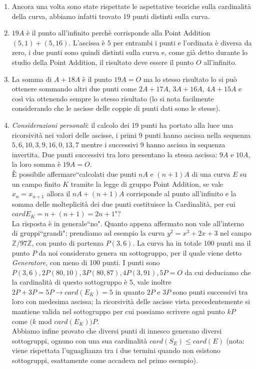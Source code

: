 \documentclass[a4paper,12pt]{tesiinfo}
\begin{document}
\begin{enumerate}
    
    \item Ancora una volta sono state rispettate le aspettative teoriche sulla cardinalit\`a della curva, abbiamo infatti trovato 19 punti distinti sulla curva.
    
    \item $19A$ \`e il punto all'infinito perch\`e corrisponde alla Point Addition $(5, 1) + (5, 16)$. L'ascissa \`e $5$ per entrambi i punti e l'ordinata \`e diversa da zero, i due punti sono quindi distinti sulla curva e, come gi\`a detto durante lo studio della Point Addition, il risultato deve essere il punto $O$ all'infinito.
    
    \item La somma di $A + 18A$ \`e il punto $19A = O$ ma lo stesso risultato lo si pu\`o ottenere sommando altri due punti come $2A + 17A$, $3A + 16A$, $4A + 15A$ e cos\`i via ottenendo sempre lo stesso risultato (lo si nota facilmente considerando che le ascisse delle coppie di punti dati sono le stesse).
    
    \item \textit{Considerazioni personali}: il calcolo dei 19 punti ha portato alla luce una ricorsivit\`a nei valori delle ascisse, i primi 9 punti hanno ascissa nella sequenza $5, 6, 10, 3, 9, 16, 0, 13, 7$ mentre i successivi 9 hanno ascissa in sequenza invertita. Due punti successivi tra loro presentano la stessa ascissa: $9A$ e $10A$, la loro somma \`e $19A = O$. 
    \\
    \`E possibile affermare``calcolati due punti $nA$ e $(n+1)A$ di una curva $E$ su un campo finito $K$ tramite la legge di gruppo Point Addition, se vale $x_n = x_{n+1}$ allora il $nA + (n+1)A$ corrisponde al punto all'infinito e la somma delle molteplicit\`a dei due punti costituisce la Cardinalit\`a, per cui $cardE_K = n+(n+1) = 2n+1$"?
    \\
    La risposta \`e in generale``no". Quanto appena affermato non vale all'interno di gruppi``grandi"; prendiamo ad esempio la curva $y^2 = x^3 + 2x+3$ nel campo $\mathbb{Z}/97\mathbb{Z}$, con punto di partenza $P(3, 6)$. La curva ha in totale 100 punti ma il punto $P$ da noi considerato genera un sottogruppo, per il quale viene detto \textit{Generatore}, con meno di 100 punti. I punti sono $P(3, 6), 2P(80, 10), 3P(80, 87), 4P(3, 91), 5P = O$ da cui deduciamo che la cardinalit\`a di questo sottogruppo \`e 5, vale inoltre $2P+3P = 5P \to card(E_K) = 5$ in quanto $2P$ e $3P$ sono punti successivi tra loro con medesima ascissa; la ricorsivit\`a delle ascisse vista precedentemente si mantiene valida nel sottogruppo per cui possiamo scrivere ogni punto $kP$ come $(k$ mod $card(E_K))P$.\\
    Abbiamo infine provato che diversi punti di innesco generano diversi sottogruppi, ognuno con una sua cardinalit\`a $card(S_E) \le card(E)$ (nota: viene rispettata l'uguaglianza tra i due termini quando non esistono sottogruppi, esattamente come accadeva nel primo esempio). 
    
\end{enumerate}
\end{document}
